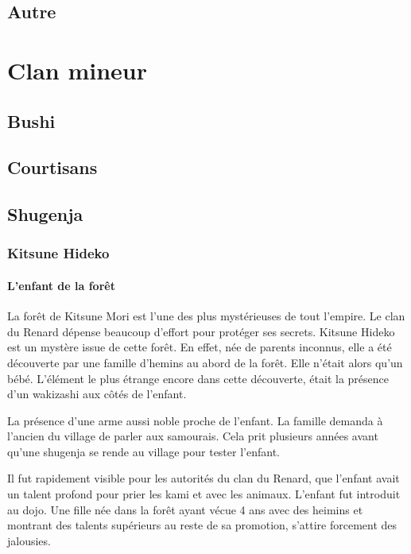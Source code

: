 \documentclass[10pt,a4paper]{book}
\begin{document}
\section{Autre}


\chapter{Clan mineur}

\section{Bushi}

\section{Courtisans}

\section{Shugenja}

\subsection{Kitsune Hideko}
\subsubsection*{L’enfant de la forêt}

La forêt de Kitsune Mori est l’une des plus mystérieuses de tout l’empire.
Le clan du Renard dépense beaucoup d’effort pour protéger ses secrets.
Kitsune Hideko est un mystère issue de cette forêt. En effet, née de parents inconnus, elle a été découverte par une famille d’hemins au abord de la forêt. Elle n’était alors qu’un bébé. L’élément le plus étrange encore dans cette découverte, était la présence d’un wakizashi aux côtés de l’enfant.

La présence d’une arme aussi noble proche de l’enfant. La famille demanda à l’ancien du village de parler aux samourais. Cela prit plusieurs années avant qu’une shugenja se rende au village pour tester l’enfant.

Il fut rapidement visible pour les autorités du clan du Renard, que l’enfant avait un talent profond pour prier les kami et avec les animaux. L’enfant fut introduit au dojo. Une fille née dans la forêt ayant vécue 4 ans avec des heimins et montrant des talents supérieurs au reste de sa promotion, s’attire forcement des jalousies.
\end{document}
